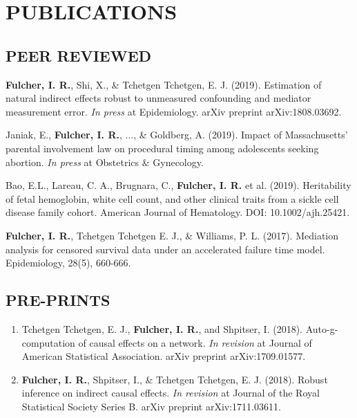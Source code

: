 \documentclass[12pt]{article}
\begin{document}
\section*{\textbf{{\large P}{UBLICATIONS}}}

\subsection*{\textbf{PEER REVIEWED}}

\begin{etaremune}
\item \textbf{Fulcher, I. R.}, Shi, X., \& Tchetgen Tchetgen, E. J. (2019). Estimation of natural indirect effects robust to unmeasured confounding and mediator measurement error. \textit{In press} at Epidemiology. arXiv preprint arXiv:1808.03692.  

\item Janiak, E., \textbf{Fulcher, I. R.}, ..., \& Goldberg, A. (2019). Impact of Massachusetts' parental involvement law on procedural timing among adolescents seeking abortion. \textit{In press} at Obstetrics \& Gynecology.

\item Bao, E.L., Lareau, C. A., Brugnara, C., \textbf{Fulcher, I. R.} et al. (2019). Heritability of fetal hemoglobin, white cell count, and other clinical traits from a sickle cell disease family cohort. American Journal of Hematology. DOI: 10.1002/ajh.25421. 

\item \textbf{Fulcher, I. R.}, Tchetgen Tchetgen E. J., \& Williams, P. L. (2017). Mediation analysis for censored survival data under an accelerated failure time model.  Epidemiology, 28(5), 660-666. 

\end{etaremune}

\subsection*{\textbf{PRE-PRINTS}}

\begin{enumerate}
	\item Tchetgen Tchetgen, E. J., \textbf{Fulcher, I. R.}, and Shpitser, I. (2018). Auto-g-computation of causal effects on a network. \textit{In revision} at Journal of American Statistical Association. arXiv preprint arXiv:1709.01577. 
	
	\item \textbf{Fulcher, I. R.}, Shpitser, I., \& Tchetgen Tchetgen, E. J. (2018). Robust inference on indirect causal effects.  \textit{In revision} at Journal of the Royal Statistical Society Series B. arXiv preprint arXiv:1711.03611. 
\end{enumerate}
\end{document}
